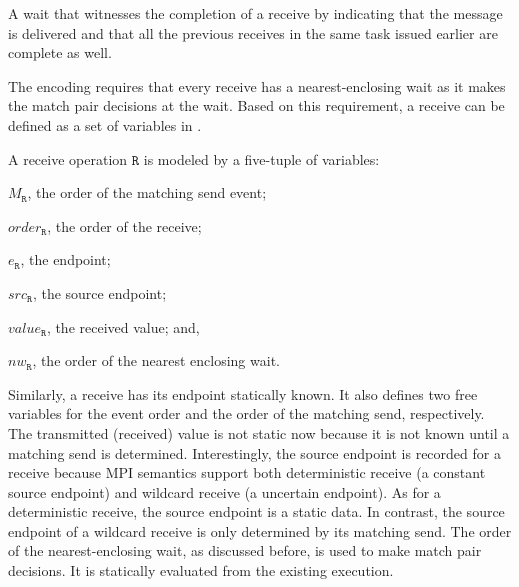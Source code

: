 \begin{definition} \label{def:nw}
A wait that witnesses the completion of a receive by indicating that
the message is delivered and that all the previous receives in the
same task issued earlier are complete as well.
\end{definition}

The encoding requires that every receive has a nearest-enclosing wait as it makes the match pair decisions at the wait. Based on this requirement, a receive can be defined as a set of variables in .

\begin{definition}[Receive] \label{def:rcv}
A receive operation $\mathtt{R}$ is modeled by a five-tuple of variables:
\begin{compactenum}
\item $M_\mathtt{R}$, the order of the matching send event;
\item $\mathit{order}_\mathtt{R}$, the order of the receive;
\item $e_\mathtt{R}$, the endpoint;
\item $src_\mathtt{R}$, the source endpoint;
\item $\mathit{value}_\mathtt{R}$, the received value; and,
\item $\mathit{nw}_\mathtt{R}$, the order of the nearest enclosing wait.
\end{compactenum}
\end{definition}

Similarly, a receive has its endpoint statically known. It also defines two free variables for the event order and the order of the matching send, respectively. The transmitted (received) value is not static now because it is not known until a matching send is determined. Interestingly, the source endpoint is recorded for a receive because MPI semantics support both deterministic receive (a constant source endpoint) and wildcard receive (a uncertain endpoint). As for a deterministic receive, the source endpoint is a static data. In contrast, the source endpoint of a wildcard receive is only determined by its matching send. The order of the nearest-enclosing wait, as discussed before, is used to make match pair decisions. It is statically evaluated from the existing execution.

